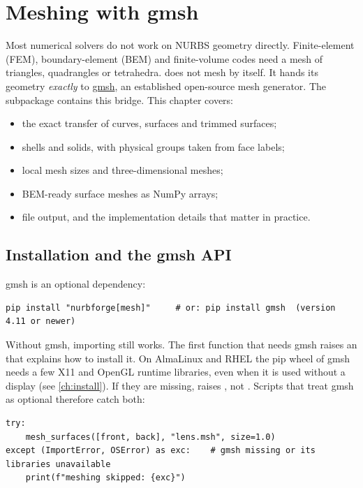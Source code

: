 \chapter{Meshing with gmsh}\label{ch:meshing}

Most numerical solvers do not work on NURBS geometry directly. Finite-element (FEM),
boundary-element (BEM) and finite-volume codes need a mesh of triangles, quadrangles or
tetrahedra. \NF{} does not mesh by itself. It hands its geometry \emph{exactly} to
\href{https://gmsh.info}{gmsh}, an established open-source mesh generator. The subpackage
 contains this bridge. This chapter covers:
\begin{itemize}
  \item the exact transfer of curves, surfaces and trimmed surfaces;
  \item shells and solids, with physical groups taken from face labels;
  \item local mesh sizes and three-dimensional meshes;
  \item BEM-ready surface meshes as NumPy arrays;
  \item file output, and the implementation details that matter in practice.
\end{itemize}

\section{Installation and the gmsh API}

gmsh is an optional dependency:

\begin{lstlisting}[style=shell]
pip install "nurbforge[mesh]"     # or: pip install gmsh  (version 4.11 or newer)
\end{lstlisting}

Without gmsh, importing  still works. The first function that needs gmsh
raises an  that explains how to install it. On AlmaLinux and RHEL the pip wheel of
gmsh needs a few X11 and OpenGL runtime libraries, even when it is used without a display (see
\cref{ch:install}). If they are missing,  raises , not
. Scripts that treat gmsh as optional therefore catch both:

\begin{lstlisting}[style=python]
try:
    mesh_surfaces([front, back], "lens.msh", size=1.0)
except (ImportError, OSError) as exc:    # gmsh missing or its libraries unavailable
    print(f"meshing skipped: {exc}")
\end{lstlisting}

